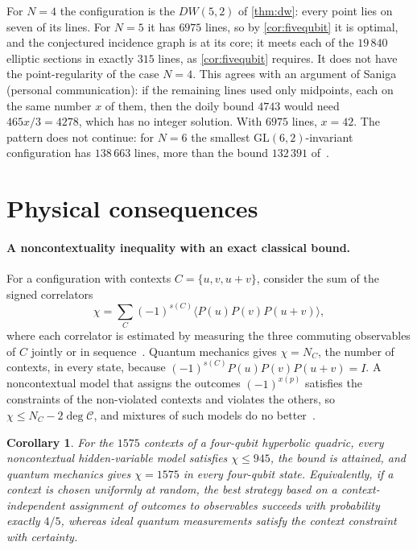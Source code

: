 \documentclass[11pt]{article}
\newtheorem{corollary}[corollary]{Corollary}
\theoremstyle{definition}
\theoremstyle{remark}
\newcommand{\dg}{\operatorname{deg}}
\begin{document}
For $N=4$ the configuration is the $DW(5,2)$ of \cref{thm:dw}: every point lies on seven of its lines.
For $N=5$ it has $6975$ lines, so by \cref{cor:fivequbit} it is optimal, and the conjectured incidence graph is at its core; it meets each of the $19\,840$ elliptic sections in exactly $315$ lines, as \cref{cor:fivequbit} requires.
It does not have the point-regularity of the case $N=4$.
This agrees with an argument of Saniga (personal communication): if the remaining lines used only midpoints, each on the same number $x$ of them, then the doily bound $4743$ would need $465x/3=4278$, which has no integer solution. With $6975$ lines, $x=42$.
The pattern does not continue: for $N=6$ the smallest $\mathrm{GL}(6,2)$-invariant configuration has $138\,663$ lines, more than the bound $132\,391$ of~\cite{Muller24}.

\section{Physical consequences}\label{sec:physics}

\paragraph{A noncontextuality inequality with an exact classical bound.}
For a configuration with contexts $C=\{u,v,u+v\}$, consider the sum of the signed correlators
\[\chi=\sum_C(-1)^{s(C)}\bigl\langle P(u)P(v)P(u+v)\bigr\rangle,\]
where each correlator is estimated by measuring the three commuting observables of $C$ jointly or in sequence~\cite{Cabello08,Cabello10}.
Quantum mechanics gives $\chi=N_C$, the number of contexts, in every state, because $(-1)^{s(C)}P(u)P(v)P(u+v)=I$.
A noncontextual model that assigns the outcomes $(-1)^{x(p)}$ satisfies the constraints of the non-violated contexts and violates the others, so $\chi\le N_C-2\dg\mathcal C$, and mixtures of such models do no better~\cite{Kelleher24}.

\begin{corollary}\label{cor:inequality}
For the $1575$ contexts of a four-qubit hyperbolic quadric, every noncontextual hidden-variable model satisfies $\chi\le945$, the bound is attained, and quantum mechanics gives $\chi=1575$ in every four-qubit state.
Equivalently, if a context is chosen uniformly at random,
the best strategy based on a context-independent assignment
of outcomes to observables succeeds with probability exactly
$4/5$, whereas ideal quantum measurements satisfy the
context constraint with certainty.
\end{corollary}
\end{document}
